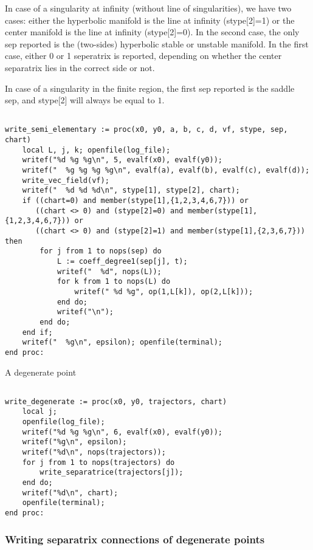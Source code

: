 \documentclass[a4paper,10pt]{article}
\begin{document}
In case of a singularity at infinity (without line of singularities), we have two cases: either the hyperbolic manifold is the line at infinity (stype[2]=1) or the center manifold is the line at infinity (stype[2]=0).  In the second case, the only sep reported is the (two-sides) hyperbolic stable or unstable manifold.  In the first case, either 0 or 1 seperatrix is reported, depending on whether the center separatrix lies in the correct side or not.

In case of a singularity in the finite region, the first sep reported is the saddle sep, and stype[2] will always be equal to $1$.

\begin{lstlisting}[name=writelog]

write_semi_elementary := proc(x0, y0, a, b, c, d, vf, stype, sep, chart)
    local L, j, k; openfile(log_file);
    writef("%d %g %g\n", 5, evalf(x0), evalf(y0));
    writef("  %g %g %g %g\n", evalf(a), evalf(b), evalf(c), evalf(d));
    write_vec_field(vf);
    writef("  %d %d %d\n", stype[1], stype[2], chart);
    if ((chart=0) and member(stype[1],{1,2,3,4,6,7})) or
       ((chart <> 0) and (stype[2]=0) and member(stype[1],{1,2,3,4,6,7})) or
       ((chart <> 0) and (stype[2]=1) and member(stype[1],{2,3,6,7})) then
        for j from 1 to nops(sep) do
            L := coeff_degree1(sep[j], t);
            writef("  %d", nops(L));
            for k from 1 to nops(L) do
                writef(" %d %g", op(1,L[k]), op(2,L[k]));
            end do;
            writef("\n");
        end do;
    end if;
    writef("  %g\n", epsilon); openfile(terminal);
end proc:
\end{lstlisting}

A degenerate point

\begin{lstlisting}[name=writelog]

write_degenerate := proc(x0, y0, trajectors, chart)
    local j;
    openfile(log_file);
    writef("%d %g %g\n", 6, evalf(x0), evalf(y0));
    writef("%g\n", epsilon);
    writef("%d\n", nops(trajectors));
    for j from 1 to nops(trajectors) do
        write_separatrice(trajectors[j]);
    end do;
    writef("%d\n", chart);
    openfile(terminal);
end proc:

\end{lstlisting}

\subsubsection{Writing separatrix connections of degenerate points}
\end{document}

